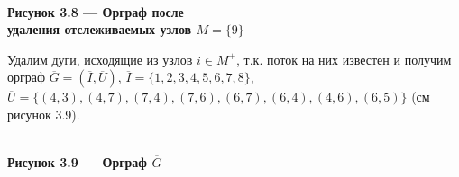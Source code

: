 \documentclass[14pt]{extarticle}%
\begin{document}
\begin{center}
\\
\textbf{Рисунок 3.8 --- Орграф после \\удаления отслеживаемых узлов $M=\{9\}$}
\end{center}

Удалим дуги, исходящие из узлов $i\in M^+$, т.к. поток на них известен и получим орграф $\overline{G}=(\overline{I},\overline{U})$, $\overline{I}=\{1,2,3,4,5,6,7,8\}$,\\ $\overline{U}=\{(4, 3), (4, 7), (7, 4), (7, 6), (6, 7), (6, 4), (4, 6), (6, 5)\}$ (см рисунок 3.9).

\begin{center}
\\
\textbf{Рисунок 3.9 --- Орграф $\overline{G}$}
\end{center}
\end{document}
